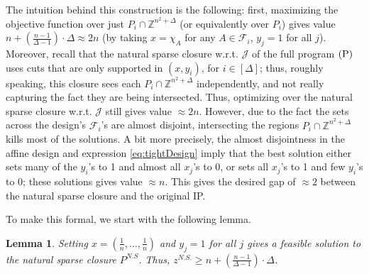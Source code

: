 \documentclass[smallextended]{svjour3}
\newtheorem{lemma}[proposition]{Lemma}
\begin{document}
	The intuition behind this construction is the following: first, maximizing the objective function over just $P_i \cap {\mathbb{Z}}^{n^2 + \Delta}$ (or equivalently over $P_i$) gives value $n + \left(\frac{n - 1}{\Delta - 1}\right) \cdot \Delta \approx 2n$ (by taking $x = \chi_A$ for any $A \in {\mathcal{F}}_i$, $y_j = 1$ for all $j$). Moreover, recall that the natural sparse closure w.r.t. ${\mathcal{J}}$ of the full program $(\textup{P})$ uses cuts that are only supported in $(x, y_i)$, for $i \in [\Delta]$; thus, roughly speaking, this closure sees each $P_i \cap {\mathbb{Z}}^{n^2 + \Delta}$ independently, and not really capturing the fact they are being intersected. Thus, optimizing over the natural sparse closure w.r.t. ${\mathcal{J}}$ still gives value $\approx 2n$. However, due to the fact the sets across the design's ${\mathcal{F}}_i$'s are almost disjoint, intersecting the regions $P_i \cap {\mathbb{Z}}^{n^2 + \Delta}$ kills most of the solutions. A bit more precisely, the almost disjointness in the affine design and expression \eqref{eq:tightDesign} imply that the best solution either sets many of the $y_i$'s to 1 and almost all $x_j$'s to 0, or sets all $x_j$'s to 1 and few $y_i$'s to 0; these solutions gives value $\approx n$. This gives the desired gap of $\approx 2$ between the natural sparse closure and the original IP.
	
	To make this formal, we start with the following lemma.
	
	\begin{lemma} \label{lemma:designNS}
		Setting $x = (\frac{1}{n}, \ldots, \frac{1}{n})$ and $y_j = 1$ for all $j$ gives a feasible solution to the natural sparse closure $P^{N.S}$. Thus, $z^{N.S.} \ge n + \left(\frac{n-1}{\Delta-1}\right) \cdot \Delta$.
	\end{lemma}
	
\end{document}

